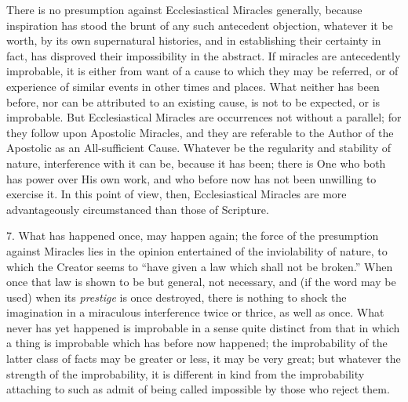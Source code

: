 There is no presumption against Ecclesiastical
Miracles generally, because inspiration has stood the brunt of any
such antecedent objection, whatever it be worth, by its own
supernatural histories, and in establishing their certainty in fact,
has disproved their impossibility in the abstract. If miracles are
antecedently improbable, it is either from want of a cause to which
they may be referred, or of experience of similar events in other
times and places. What neither has been before, nor can be attributed
to an existing cause, is not to be expected, or is improbable. But
Ecclesiastical Miracles are occurrences not without a parallel; for
they follow upon Apostolic Miracles, and they are referable to the
Author of the Apostolic as an All-sufficient Cause. Whatever be the
regularity and stability of nature, interference with it can be,
because it has been; there is One who both has power over His own
work, and who before now has not been unwilling to exercise it. In
this point of view, then, Ecclesiastical Miracles are more
advantageously circumstanced than those of Scripture.

7.
What has happened once, may happen again; the force of the presumption
against Miracles lies in the opinion entertained of the inviolability
of nature, to which the Creator seems to ``have given a law which
shall not be broken.'' When once that law is shown to be but general,
not necessary, and (if the word may be used) when its \emph{prestige}
is once destroyed, there is nothing to shock the imagination in
a miraculous interference twice or thrice, as well as once. What never
has yet happened is improbable in a sense quite distinct from that in
which a thing is improbable which has before now happened; the
improbability of the latter class of facts may be greater or less, it
may be very great; but whatever the strength of the improbability, it
is different in kind from the improbability attaching to such as admit
of being called impossible by those who reject them.


